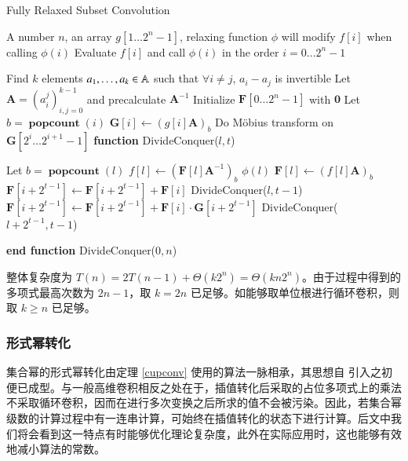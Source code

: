 \begin{breakablealgorithm}
  \caption{Fully Relaxed Subset Convolution}
  \begin{algorithmic}[1]
    \REQUIRE A number $n$, an array $g[1\dots 2^n-1]$, relaxing function $\phi$ will modify $f[i]$ when calling $\phi(i)$
    \ENSURE Evaluate $f[i]$ and call $\phi(i)$ in the order $i=0\dots 2^n-1$
   
    \STATE Find $k$ elements $a_1,\dots,a_k\in \mathbb A$ such that $\forall i\neq j$, $a_i-a_j$ is invertible
    \STATE Let $\mathbf A = (a_i^j)_{i,j=0}^{k-1}$ and precalculate $\mathbf A^{-1}$
    \STATE Initialize $\mathbf F[0\dots 2^n-1]$ with $\mathbf 0$
      \STATE Let $b = \operatorname{\mathbf{popcount}}(i)$
      \STATE $\mathbf G[i] \leftarrow (g[i] \mathbf A)_b$
    \ENDFOR
      \STATE Do M\"obius transform on $\mathbf G[2^i\dots 2^{i+1}-1]$
    \ENDFOR
    \STATE \textbf{function} DivideConquer($l, t$) \COMMENT {solve $[l, l+2^t)$}
    \begin{ALC@g} %
      \STATE Let $b = \operatorname{\mathbf{popcount}}(l)$
      \STATE $f[l] \leftarrow (\mathbf F[l] \mathbf A^{-1})_b$ 
      \STATE $\phi(l)$
      \STATE $\mathbf F[l] \leftarrow (f[l] \mathbf A)_b$
    \ELSE
        \STATE $\mathbf F[i + 2^{t-1}] \leftarrow \mathbf F[i + 2^{t-1}] + \mathbf F[i]$
      \ENDFOR
      \STATE DivideConquer($l, t-1$)
        \STATE $\mathbf F[i + 2^{t-1}] \leftarrow \mathbf F[i + 2^{t-1}] + \mathbf F[i] \cdot \mathbf G[i + 2^{t-1}]$
      \ENDFOR
      \STATE DivideConquer($l+2^{t-1}, t-1$)
    \ENDIF
    \end{ALC@g}
    \STATE \textbf{end function}
    \STATE DivideConquer($0, n$)
  \end{algorithmic}
\end{breakablealgorithm}

整体复杂度为 $T(n)=2T(n-1)+\Theta(k2^n)=\Theta(kn2^n)$。由于过程中得到的多项式最高次数为 $2n-1$，取 $k=2n$ 已足够。如能够取单位根进行循环卷积，则取 $k\ge n$ 已足够。

\subsubsection{形式幂转化}

集合幂的形式幂转化由定理 \ref{cupconv} 使用的算法一脉相承，其思想自 \cite{vfk} 引入之初便已成型。与一般高维卷积相反之处在于，插值转化后采取的占位多项式上的乘法不采取循环卷积，因而在进行多次变换之后所求的值不会被污染。因此，若集合幂级数的计算过程中有一连串计算，可始终在插值转化的状态下进行计算。后文中我们将会看到这一特点有时能够优化理论复杂度，此外在实际应用时，这也能够有效地减小算法的常数。

